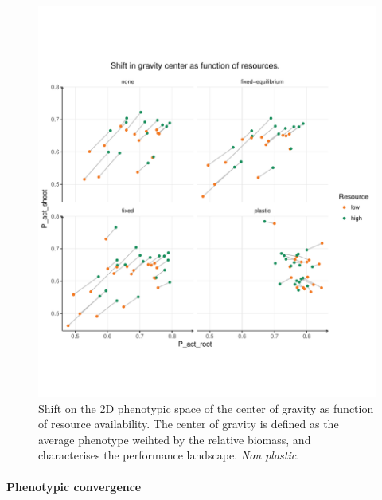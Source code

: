 \begin{figure}\label{fig:gravity_shift_resource}
\includegraphics[width = \textwidth]{./2_PP/Figures/Landscape/ld_gravity_resourceall.pdf}
\caption{Shift on the 2D phenotypic space of the center of gravity as function of resource availability. The center of gravity is defined as the average phenotype weihted by the relative biomass, and characterises the performance landscape. \textit{Non plastic}.}
\end{figure}
%
%
%
%
%
%


\paragraph{Phenotypic convergence}

